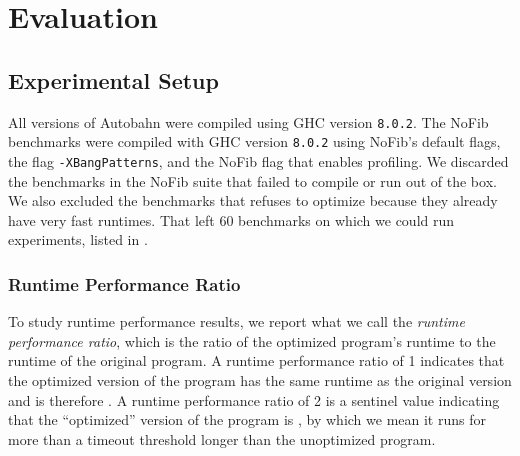 \chapter{Evaluation} 

\label{Chapter5} %


\section{Experimental Setup}

All versions of Autobahn were compiled using GHC
version \texttt{8.0.2}. The NoFib benchmarks were compiled with
GHC version \texttt{8.0.2} using NoFib's default flags, the flag
\texttt{-XBangPatterns}, and the NoFib flag that enables profiling.
We discarded the benchmarks in the NoFib suite that failed to compile
or run out of the box. We also excluded the benchmarks that \Ao{}
refuses to optimize because they already have very fast runtimes. That
left 60 benchmarks on which we could run experiments, listed in .

\subsection{Runtime Performance Ratio}
To study runtime performance results, we report what we call
the \textit{runtime performance ratio}, which is the ratio of the
optimized program's runtime to the runtime of the original program. 
A runtime performance ratio of 1 indicates that
the optimized version of the program has the same runtime as the
original version and is therefore \textit{\unimp{}}.  A runtime
performance ratio of 2 is a sentinel value indicating that the
``optimized'' version of the program is \textit{\nonterm{}}, by which
we mean it runs for more than a timeout threshold longer than the
unoptimized program. 

